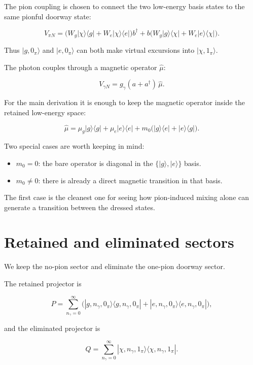 \documentclass[
]{article}
\renewcommand{\[}{\begin{equation}}
\renewcommand{\]}{\end{equation}}
\providecommand{\tightlist}{%
  \setlength{\itemsep}{0pt}\setlength{\parskip}{0pt}}
\begin{document}
The pion coupling is chosen to connect the two low-energy basis states
to the same pionful doorway state:

\[
V_{\pi N} =
\Big(
W_g |\chi\rangle\langle g|
+
W_e |\chi\rangle\langle e|
\Big)b^\dagger
+
b\Big(
W_g |g\rangle\langle \chi|
+
W_e |e\rangle\langle \chi|
\Big).
\label{eq:Vpiontoy}
\]

Thus \(|g,0_\pi\rangle\) and \(|e,0_\pi\rangle\) can both make virtual
excursions into \(|\chi,1_\pi\rangle\).

The photon couples through a magnetic operator \(\hat\mu\):

\[
V_{\gamma N} =
g_\gamma (a+a^\dagger)\,\hat\mu.
\label{eq:Vphotonfull}
\]

For the main derivation it is enough to keep the magnetic operator
inside the retained low-energy space:

\[
\hat\mu =
\mu_g |g\rangle\langle g|
+
\mu_e |e\rangle\langle e|
+
m_0\Big(|g\rangle\langle e| + |e\rangle\langle g|\Big).
\label{eq:muBare}
\]

Two special cases are worth keeping in mind:

\begin{itemize}
\tightlist
\item
  \(m_0 = 0\): the bare operator is diagonal in the
  \(\{|g\rangle,|e\rangle\}\) basis.
\item
  \(m_0 \neq 0\): there is already a direct magnetic transition in that
  basis.
\end{itemize}

The first case is the cleanest one for seeing how pion-induced mixing
alone can generate a transition between the dressed states.

\section{Retained and eliminated
sectors}\label{retained-and-eliminated-sectors}

We keep the no-pion sector and eliminate the one-pion doorway sector.

The retained projector is

\[
P =
\sum_{n_\gamma=0}^{\infty}
\Big(
|g,n_\gamma,0_\pi\rangle\langle g,n_\gamma,0_\pi|
+
|e,n_\gamma,0_\pi\rangle\langle e,n_\gamma,0_\pi|
\Big),
\label{eq:Pprojector}
\]

and the eliminated projector is

\[
Q =
\sum_{n_\gamma=0}^{\infty}
|\chi,n_\gamma,1_\pi\rangle\langle \chi,n_\gamma,1_\pi|.
\label{eq:Qprojector}
\]
\end{document}

